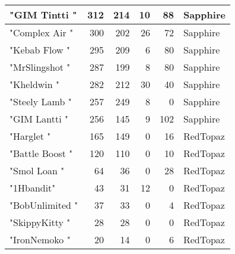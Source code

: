 \documentclass{article}
\begin{document}
\begin{table}[htbp]
\begin{tabular}{|l|r|r|r|r|l|}
"GIM Tintti " & 312 & 214 & 10 & 88 & Sapphire \\ \hline
"Complex Air " & 300 & 202 & 26 & 72 & Sapphire \\ \hline
"Kebab Flow " & 295 & 209 & 6 & 80 & Sapphire \\ \hline
"MrSlingshot " & 287 & 199 & 8 & 80 & Sapphire \\ \hline
"Kheldwin " & 282 & 212 & 30 & 40 & Sapphire \\ \hline
"Steely Lamb " & 257 & 249 & 8 & 0 & Sapphire \\ \hline
"GIM Lantti " & 256 & 145 & 9 & 102 & Sapphire \\ \hline
"Harglet " & 165 & 149 & 0 & 16 & RedTopaz \\ \hline
"Battle Boost " & 120 & 110 & 0 & 10 & RedTopaz \\ \hline
"Smol Loan " & 64 & 36 & 0 & 28 & RedTopaz \\ \hline
"1Hbandit" & 43 & 31 & 12 & 0 & RedTopaz \\ \hline
"BobUnlimited " & 37 & 33 & 0 & 4 & RedTopaz \\ \hline
"SkippyKitty " & 28 & 28 & 0 & 0 & RedTopaz \\ \hline
"IronNemoko " & 20 & 14 & 0 & 6 & RedTopaz \\ \hline
\end{tabular}
\end{table}
\end{document}
